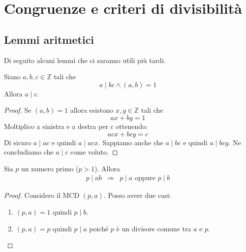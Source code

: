 \chapter{Congruenze e criteri di divisibilit\`a}
\section{Lemmi aritmetici}
Di seguito alcuni lemmi che ci saranno utili pi\`u tardi.

\begin{lemma}
	Siano $a, b, c \in \mathbb{Z}$ tali che
	\begin{equation*}
		a \mid bc \wedge (a, b) = 1
	\end{equation*}
	Allora $a \mid c$.
	\begin{proof}
		Se $(a, b) = 1$ allora esistono $x, y \in \mathbb{Z}$ tali che
		\begin{equation*}
			ax + by = 1
		\end{equation*}
		Moltiplico a sinistra e a destra per $c$ ottenendo:
		\begin{equation*}
			acx + bcy = c
		\end{equation*}
		Di sicuro $a \mid ac$ e quindi $a \mid acx$. Sappiamo anche che $a \mid bc$ e quindi
		$a \mid bcy$. Ne concludiamo che $a \mid c$ come voluto.
	\end{proof}
\end{lemma}

\begin{lemma}
	Sia $p$ un numero primo ($p > 1$). Allora
	\begin{equation*}
		\begin{array}{lll}
			p \mid ab & \Rightarrow & p \mid a \text{ oppure } p \mid b
		\end{array}
	\end{equation*}
	\begin{proof}
		Considero il MCD $(p, a)$. Posso avere due casi:
		\begin{enumerate}
			\item $(p, a) = 1$ quindi $p \mid b$.
			\item $(p, a) = p$ quindi $p \mid a$ poich\'e $p$ \`e un divisore comune tra
			      $a$ e $p$.
		\end{enumerate}
	\end{proof}
\end{lemma}

